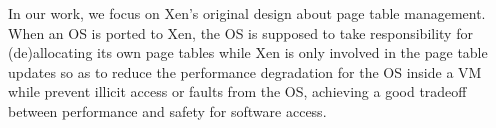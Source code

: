 
In our work, we focus on Xen's original design about page table management. When an OS is ported to Xen, the OS is supposed to take responsibility for (de)allocating its own page tables while Xen is only involved in the page table updates so as to reduce the performance degradation for the OS inside a VM while prevent illicit access or faults from the OS, achieving a good tradeoff between performance and safety for software access.



